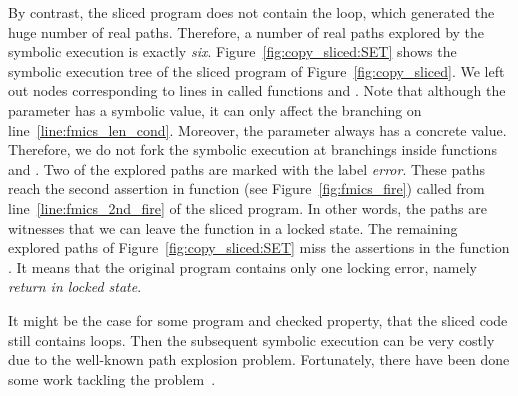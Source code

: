 By contrast, the sliced program does not contain the loop, which generated
the huge number of real paths. Therefore, a number of real paths explored by
the symbolic execution is exactly \emph{six}. Figure~\ref{fig:copy_sliced:SET}
shows the symbolic execution tree of the sliced program of
Figure~\ref{fig:copy_sliced}. We left out nodes corresponding to lines in
called functions  and . Note that
although the parameter  has a symbolic value, it can only affect
the branching on line~\ref{line:fmics_len_cond}. Moreover, the parameter
 always has a concrete value. Therefore, we do not fork the symbolic
execution at branchings inside functions  and
. Two of the explored paths are marked with the label
\emph{error}.  These paths reach the second assertion in function
 (see Figure~\ref{fig:fmics_fire}) called from
line~\ref{line:fmics_2nd_fire} of the sliced program. In other words, the
paths are witnesses that we can leave the function  in a locked
state. The remaining explored paths of Figure~\ref{fig:copy_sliced:SET} miss
the assertions in the function . It means that the original
program contains only one locking error, namely \emph{return in locked state}.

It might be the case for some program and checked property, that the sliced
code still contains loops. Then the subsequent symbolic execution can be very
costly due to the well-known path explosion problem. Fortunately, there have
been done some work tackling the problem~\cite{G07, grammar3, GNRT10, SPmCS09,
XGM08, cse_atva}.



